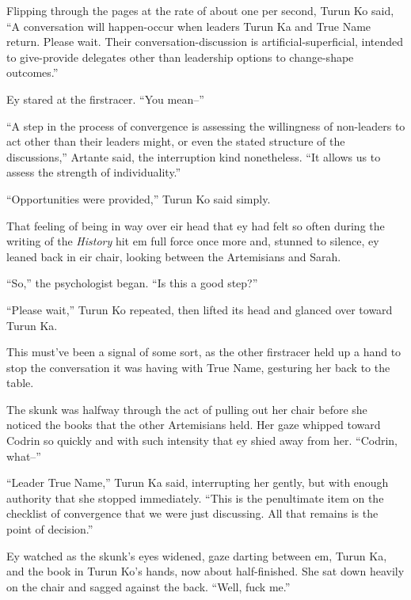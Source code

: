 Flipping through the pages at the rate of about one per second, Turun Ko said, ``A conversation will happen-occur when leaders Turun Ka and True Name return. Please wait. Their conversation-discussion is artificial-superficial, intended to give-provide delegates other than leadership options to change-shape outcomes.''

Ey stared at the firstracer. ``You mean--''

``A step in the process of convergence is assessing the willingness of non-leaders to act other than their leaders might, or even the stated structure of the discussions,'' Artante said, the interruption kind nonetheless. ``It allows us to assess the strength of individuality.''

``Opportunities were provided,'' Turun Ko said simply.

That feeling of being in way over eir head that ey had felt so often during the writing of the \emph{History} hit em full force once more and, stunned to silence, ey leaned back in eir chair, looking between the Artemisians and Sarah.

``So,'' the psychologist began. ``Is this a good step?''

``Please wait,'' Turun Ko repeated, then lifted its head and glanced over toward Turun Ka.

This must've been a signal of some sort, as the other firstracer held up a hand to stop the conversation it was having with True Name, gesturing her back to the table.

The skunk was halfway through the act of pulling out her chair before she noticed the books that the other Artemisians held. Her gaze whipped toward Codrin so quickly and with such intensity that ey shied away from her. ``Codrin, what--''

``Leader True Name,'' Turun Ka said, interrupting her gently, but with enough authority that she stopped immediately. ``This is the penultimate item on the checklist of convergence that we were just discussing. All that remains is the point of decision.''

Ey watched as the skunk's eyes widened, gaze darting between em, Turun Ka, and the book in Turun Ko's hands, now about half-finished. She sat down heavily on the chair and sagged against the back. ``Well, fuck me.''
